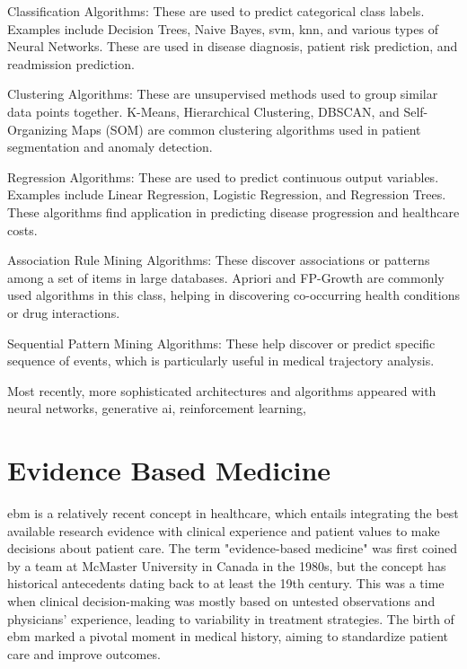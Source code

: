 Classification Algorithms: These are used to predict categorical class labels. Examples include Decision Trees, Naive Bayes, \ac{svm}, \ac{knn}, and various types of Neural Networks. These are used in disease diagnosis, patient risk prediction, and readmission prediction.

Clustering Algorithms: These are unsupervised methods used to group similar data points together. K-Means, Hierarchical Clustering, DBSCAN, and Self-Organizing Maps (SOM) are common clustering algorithms used in patient segmentation and anomaly detection.

Regression Algorithms: These are used to predict continuous output variables. Examples include Linear Regression, Logistic Regression, and Regression Trees. These algorithms find application in predicting disease progression and healthcare costs.

Association Rule Mining Algorithms: These discover associations or patterns among a set of items in large databases. Apriori and FP-Growth are commonly used algorithms in this class, helping in discovering co-occurring health conditions or drug interactions.

Sequential Pattern Mining Algorithms: These help discover or predict specific sequence of events, which is particularly useful in medical trajectory analysis.

Most recently, more sophisticated architectures and algorithms appeared with neural networks, generative \ac{ai}, reinforcement learning, 






\section{Evidence Based Medicine}
\ac{ebm} is a relatively recent concept in healthcare, which entails integrating the best available research evidence with clinical experience and patient values to make decisions about patient care. The term "evidence-based medicine" was first coined by a team at McMaster University in Canada in the 1980s, but the concept has historical antecedents dating back to at least the 19th century. This was a time when clinical decision-making was mostly based on untested observations and physicians' experience, leading to variability in treatment strategies. The birth of \ac{ebm} marked a pivotal moment in medical history, aiming to standardize patient care and improve outcomes.

